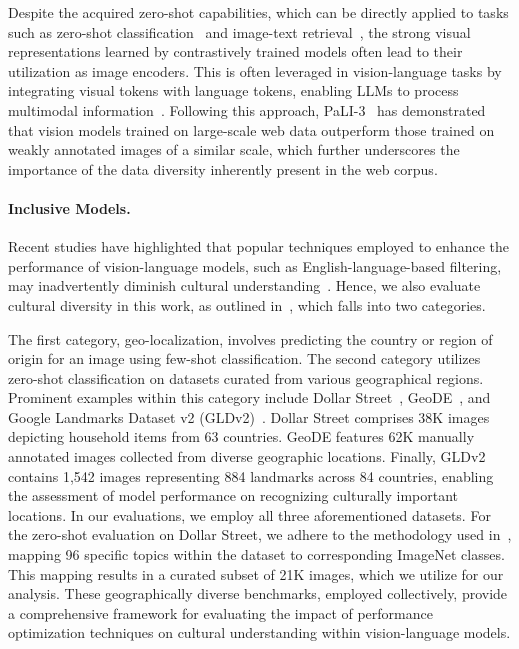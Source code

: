 Despite the acquired zero-shot capabilities, which can be directly applied to tasks such as zero-shot classification~\citep{deng2009imagenet} and image-text retrieval~\citep{chen2015microsoft,young2014image}, the strong visual representations learned by contrastively trained models often lead to their utilization as image encoders. This is often leveraged in vision-language tasks by integrating visual tokens with language tokens, enabling LLMs to process multimodal information~\citep{alayrac2022flamingo,chen2022pali,chen2023pali,li2023blip,beyer2024paligemma,liu2024visual}. Following this approach, PaLI-3~\cite{chen2023pali} has demonstrated that vision models trained on large-scale web data outperform those trained on weakly annotated images of a similar scale, which further underscores the importance of the data diversity inherently present in the web corpus.

\paragraph{Inclusive Models.}
Recent studies have highlighted that popular techniques employed to enhance the performance of vision-language models, such as English-language-based filtering, may inadvertently diminish cultural understanding~\cite{goyal2022vision,nguyen2024multilingualdiversityimprovesvisionlanguage,richards2023does,pouget2024no,ananthram2024see}. Hence, we also evaluate cultural diversity in this work, as outlined in~\citet{pouget2024no}, which falls into two categories.

The first category, geo-localization, involves predicting the country or region of origin for an image using few-shot classification.  The second category utilizes zero-shot classification on datasets curated from various geographical regions.  Prominent examples within this category include Dollar Street~\cite{rojas2022dollar}, GeoDE~\cite{ramaswamy2024geode}, and Google Landmarks Dataset v2 (GLDv2)~\cite{weyand2020google}. Dollar Street comprises 38K images depicting household items from 63 countries. GeoDE features 62K manually annotated images collected from diverse geographic locations.  Finally, GLDv2 contains 1,542 images representing 884 landmarks across 84 countries, enabling the assessment of model performance on recognizing culturally important locations. In our evaluations, we employ all three aforementioned datasets. For the zero-shot evaluation on Dollar Street, we adhere to the methodology used in~\citet{rojas2022dollar}, mapping 96 specific topics within the dataset to corresponding ImageNet classes. This mapping results in a curated subset of 21K images, which we utilize for our analysis. These geographically diverse benchmarks, employed collectively, provide a comprehensive framework for evaluating the impact of performance optimization techniques on cultural understanding within vision-language models.


